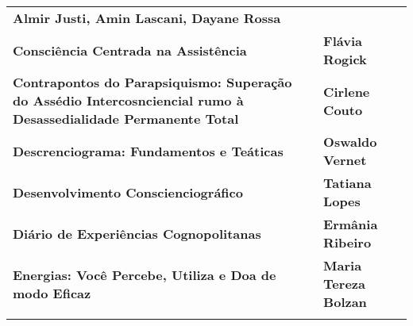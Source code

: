 \begin{longtable}[]{@{}
  >{\raggedright\arraybackslash}p{}
  >{\raggedright\arraybackslash}p{}@{}}
\begin{minipage}[b]{\linewidth}
\textbf{Almir Justi, Amin Lascani, Dayane Rossa}
\end{minipage} \\
\begin{minipage}[b]{\linewidth}\raggedright
\textbf{Consciência Centrada na Assistência}
\end{minipage} & \begin{minipage}[b]{\linewidth}\raggedright
\textbf{Flávia Rogick}
\end{minipage} \\
\begin{minipage}[b]{\linewidth}\raggedright
\textbf{Contrapontos do Parapsiquismo: Superação do Assédio Intercosnciencial rumo à Desassedialidade Permanente Total}
\end{minipage} & \begin{minipage}[b]{\linewidth}\raggedright
\textbf{Cirlene Couto}
\end{minipage} \\
\begin{minipage}[b]{\linewidth}\raggedright
\textbf{Descrenciograma: Fundamentos e Teáticas}
\end{minipage} & \begin{minipage}[b]{\linewidth}\raggedright
\textbf{Oswaldo Vernet}
\end{minipage} \\
\begin{minipage}[b]{\linewidth}\raggedright
\textbf{Desenvolvimento Conscienciográfico}
\end{minipage} & \begin{minipage}[b]{\linewidth}\raggedright
\textbf{Tatiana Lopes}
\end{minipage} \\
\begin{minipage}[b]{\linewidth}\raggedright
\textbf{Diário de Experiências Cognopolitanas}
\end{minipage} & \begin{minipage}[b]{\linewidth}\raggedright
\textbf{Ermânia Ribeiro}
\end{minipage} \\
\begin{minipage}[b]{\linewidth}\raggedright
\textbf{Energias: Você Percebe, Utiliza e Doa de modo Eficaz}
\end{minipage} & \begin{minipage}[b]{\linewidth}\raggedright
\textbf{Maria Tereza Bolzan}
\end{minipage} \\
\begin{minipage}[b]{\linewidth}\raggedright

\end{minipage}
\end{longtable}
